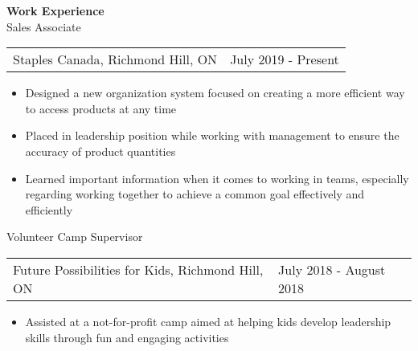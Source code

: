 \documentclass{article}
\begin{document}
	\vspace*{0.5 cm}
	\textbf{Work Experience} \\
	{\large Sales Associate} \\
	\begin{tabular}{m{3.4 in} m{3.35 in}}
		{\normalsize Staples Canada, Richmond Hill, ON} & \hfill \hfill \normalsize{July 2019 - Present}
	\end{tabular}
	
	\vspace*{-0.175 cm}
	\begin{itemize}
		\itemsep-0.1cm
		\item {\normalsize Designed a new organization system focused on creating a more efficient way to access products at any time}
		\item {\normalsize Placed in leadership position while working with management to ensure the accuracy of product quantities}
		\item {\normalsize Learned important information when it comes to working in teams, especially regarding working together to achieve a common goal effectively and efficiently}
	\end{itemize}
	
	{\large Volunteer Camp Supervisor} \\
	\begin{tabular}{m{3.4 in} m{3.35 in}}
		\normalsize{Future Possibilities for Kids, Richmond Hill, ON} & \hfill \hfill \normalsize{July 2018 - August 2018}
	\end{tabular}
	
	\vspace*{-0.175 cm}
	\begin{itemize}
		\itemsep-0.1cm
		\item {\normalsize Assisted at a not-for-profit camp aimed at helping kids develop leadership skills through fun and engaging activities}
	\end{itemize}
	
	
	
\end{document}
